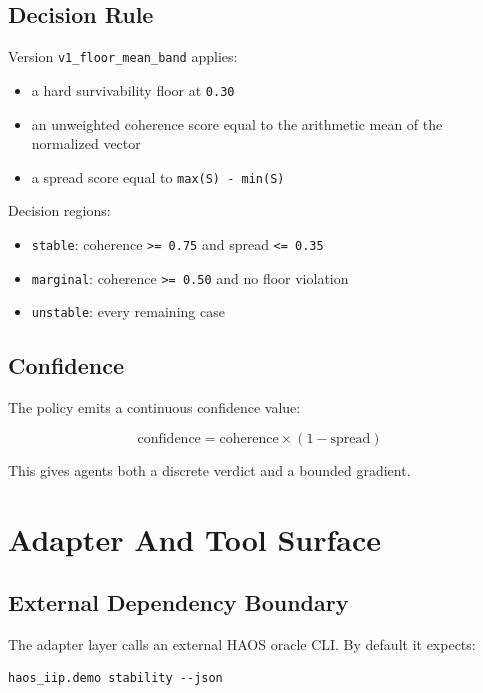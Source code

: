 \documentclass[11pt]{article}
\begin{document}
\subsection{Decision Rule}

Version \texttt{v1\_floor\_mean\_band} applies:

\begin{itemize}
\item a hard survivability floor at \texttt{0.30}
\item an unweighted coherence score equal to the arithmetic mean of the normalized vector
\item a spread score equal to \texttt{max(S) - min(S)}
\end{itemize}

Decision regions:

\begin{itemize}
\item \texttt{stable}: coherence \texttt{>= 0.75} and spread \texttt{<= 0.35}
\item \texttt{marginal}: coherence \texttt{>= 0.50} and no floor violation
\item \texttt{unstable}: every remaining case
\end{itemize}

\subsection{Confidence}

The policy emits a continuous confidence value:

\[
\mbox{confidence} = \mbox{coherence} \times (1 - \mbox{spread})
\]

This gives agents both a discrete verdict and a bounded gradient.

\section{Adapter And Tool Surface}

\subsection{External Dependency Boundary}

The adapter layer calls an external HAOS oracle CLI.
By default it expects:

\begin{verbatim}
haos_iip.demo stability --json
\end{verbatim}
\end{document}
